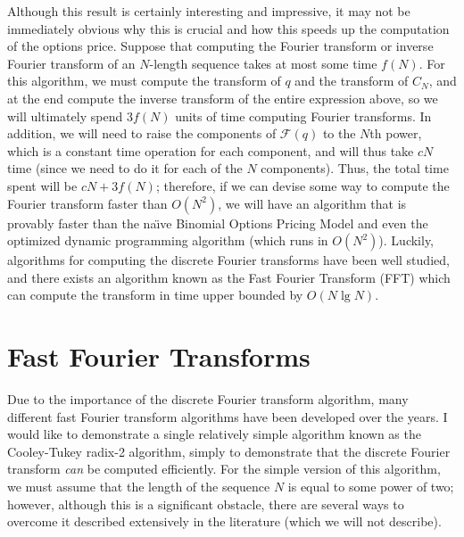 \documentclass[11pt]{article}
\newcommand\cF{\mathcal{F}}
\begin{document}
Although this result is certainly interesting and impressive, it may not be immediately obvious why
this is crucial and how this speeds up the computation of the options price. Suppose that computing
the Fourier transform or inverse Fourier transform of an $N$-length sequence takes at most some time
$f(N)$. For this algorithm, we must compute the transform of $q$ and the transform of $C_N$, and at
the end compute the inverse transform of the entire expression above, so we will ultimately spend
$3f(N)$ units of time computing Fourier transforms. In addition, we will need to raise the
components of $\cF(q)$ to the $N$th power, which is a constant time operation for each component,
and will thus take $cN$ time (since we need to do it for each of the $N$ components). Thus, the
total time spent will be $cN + 3f(N)$; therefore, if we can devise some way to compute the Fourier
transform faster than $O(N^2)$, we will have an algorithm that is provably faster than the na\"{\i}ve
Binomial Options Pricing Model and even the optimized dynamic programming algorithm (which runs in
$O(N^2)$). Luckily, algorithms for computing the discrete Fourier transforms have been well studied,
and there exists an algorithm known as the Fast Fourier Transform (FFT) which can compute the
transform in time upper bounded by $O(N \lg N)$.

\section*{Fast Fourier Transforms}

Due to the importance of the discrete Fourier transform algorithm, many different fast Fourier
transform algorithms have been developed over the years. I would like to demonstrate a single
relatively simple algorithm known as the Cooley-Tukey radix-2 algorithm, simply to demonstrate that
the discrete Fourier transform \emph{can} be computed efficiently. For the simple version of this
algorithm, we must assume that the length of the sequence $N$ is equal to some power of two;
however, although this is a significant obstacle, there are several ways to overcome it described
extensively in the literature (which we will not describe).
\end{document}
